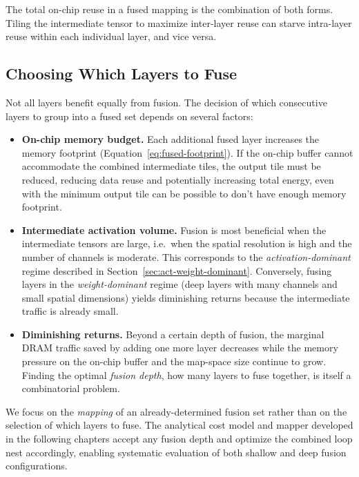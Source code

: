 The total on-chip reuse in a fused mapping is the combination of both
forms.  Tiling the
intermediate tensor to maximize inter-layer reuse can starve intra-layer
reuse within each individual layer, and vice versa.

\subsection{Choosing Which Layers to Fuse}
\label{sec:fusion-choices}

Not all layers benefit equally from fusion.  The decision of which
consecutive layers to group into a fused set depends on several factors:

\begin{itemize}
  \item \textbf{On-chip memory budget.}
        Each additional fused layer increases the memory footprint
        (Equation~\eqref{eq:fused-footprint}).  If the on-chip buffer
        cannot accommodate the combined intermediate tiles, the output
        tile must be reduced, reducing data reuse and potentially increasing
        total energy, even with the minimum output tile can be possible to don't have enough memory footprint.

  \item \textbf{Intermediate activation volume.}
        Fusion is most beneficial when the intermediate tensors are
        large, i.e.\ when the spatial resolution is high and the number
        of channels is moderate.  This corresponds to the
        \emph{activation-dominant} regime described in
        Section~\ref{sec:act-weight-dominant}.  Conversely, fusing
        layers in the \emph{weight-dominant} regime (deep layers with
        many channels and small spatial dimensions) yields diminishing
        returns because the intermediate traffic is already small.

  \item \textbf{Diminishing returns.}
        Beyond a certain depth of fusion, the marginal DRAM traffic saved
        by adding one more layer decreases while the memory pressure on
        the on-chip buffer and the map-space size continue to grow.
        Finding the optimal \emph{fusion depth},  how many
        layers to fuse together, is itself a combinatorial problem.
\end{itemize}

We focus on the \emph{mapping} of an already-determined
fusion set rather than on the selection of which layers to fuse.
The analytical cost model and mapper developed in the following chapters
accept any fusion depth and optimize the combined loop nest accordingly,
enabling systematic evaluation of both shallow and deep fusion
configurations.
